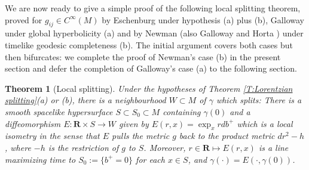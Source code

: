 \documentclass[12pt]{amsart}
\newcommand{\R}{{\mathbf R}}
\newtheorem{theorem}{Theorem}
\begin{document}
We are now ready to give a simple proof of the following local splitting theorem, proved for $g_{ij} \in C^\infty(M)$
by Eschenburg \cite[Proposition~6.3]{Eschenburg88}  under hypothesis (a) plus (b), Galloway \cite{Galloway89} under {global hyperbolicity} (a) and by Newman \cite{Newman90}
(also Galloway and Horta \cite[\S 5]{GallowayHorta96}) 
under {timelike geodesic completeness} (b).
The initial argument covers both cases
but then bifurcates:  we complete the proof of Newman's case (b) in the present section and defer the completion of Galloway's case (a) to the following section.

\begin{theorem}[Local splitting]\label{T:local splitting}
Under the hypotheses of Theorem \ref{T:Lorentzian splitting}(a) or (b),
there is a neighbourhood $W \subset M$ of $\gamma$ which splits:  
There is a 
smooth spacelike hypersurface $S \subset S_0 \subset M$ containing $\gamma(0)$ and a diffeomorphism $E:\R \times S \longrightarrow W$ given by 
$E(r,x)= \exp_x r db^+$ which is a local isometry in the sense that $E$ pulls the metric $g$ back to the product metric $dr^2 - h$,  where $-h$ is the restriction of $g$ to $S$.
Moreover, $r \in \R \mapsto E(r,x)$ is a line maximizing time to $S_0:=\{b^+=0\}$ for each $x \in S$, and $\gamma(\cdot) = E(\cdot,\gamma(0))$. 
\end{theorem}
\end{document}
